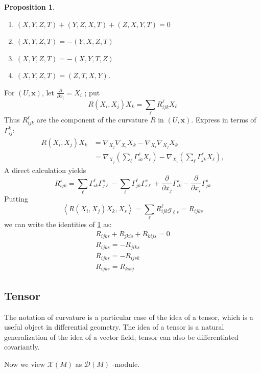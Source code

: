 \documentclass{amsart}
\theoremstyle{plain}
\newtheorem{proposition}[theorem]{Proposition}
\theoremstyle{definition}
\theoremstyle{remark}
\begin{document}
\begin{proposition}
\begin{enumerate}
		\item $(X, Y, Z, T)+(Y, Z, X, T)+(Z, X, Y, T)=0$
		\item $(X, Y, Z, T)=-(Y, X, Z, T)$
		\item $(X, Y, Z, T)=-(X, Y, T, Z)$
		\item $(X, Y, Z, T)=(Z, T, X, Y)$.
	\end{enumerate}\label{e9da3e}
\end{proposition}

For $(U,\mathbf{x})$, let $\frac{ \partial   }{ \partial x_i }=X_i$ ; put
\[
R(X_i,X_j)X_k=\sum_{\ell}R_{ijk}^{\ell}X_{\ell}
\]
Thus $R^{\ell}_{ijk}$ are the component of the curvature $R$ in $(U,\mathbf{x})$. Express in terms of $\Gamma^{k}_{ij}$:
\[
\begin{aligned}
R\left(X_i, X_j\right) X_k & =\nabla_{X_j} \nabla_{X_i} X_k-\nabla_{X_i} \nabla_{X_j} X_k \\
& =\nabla_{X_j}\left(\sum_{\ell} \Gamma_{i k}^{\ell} X_{\ell}\right)-\nabla_{X_i}\left(\sum_{\ell} \Gamma_{j k}^{\ell} X_{\ell}\right),
\end{aligned}
\]
A direct calculation yields
\[
R^{s}_{ijk}=\sum_{\ell}\Gamma^{\ell}_{ik}\Gamma^{s}_{j\ell}-\sum_{\ell}\Gamma^{\ell}_{jk}\Gamma^{s}_{i\ell}+\frac{ \partial   }{ \partial x_j } \Gamma^{s}_{ik}-\frac{ \partial   }{ \partial x_i } \Gamma^{s}_{jk}
\]
Putting
\[
\left\langle R\left(X_i, X_j\right) X_k, X_s\right\rangle=\sum_{\ell} R_{i j k}^{\ell} g_{\ell s}=R_{i j k s}
\]
we can write the identities of \cref{e9da3e}  as:
\[
\begin{gathered}
R_{i j k s}+R_{j k i s}+R_{k i j s}=0 \\
R_{i j k s}=-R_{j i k s} \\
R_{i j k s}=-R_{i j s k} \\
R_{i j k s}=R_{k s i j}
\end{gathered}
\]
\subsection{Tensor}

The notation of curvature is a particular case of the idea of a tensor, which is a useful object in differential geometry. The idea of a tensor is a natural generalization of the idea of a vector field; tensor can also be differentiated covariantly.

Now we view $\mathcal{X}(M)$ as $\mathcal{D}(M)$ -module.
\end{document}

